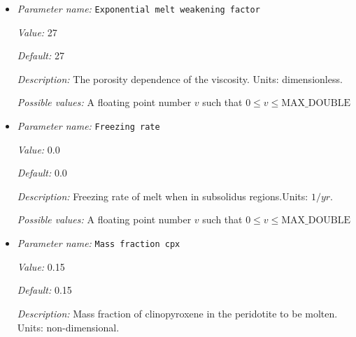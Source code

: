 \begin{itemize}
{\it Value:} 200.0


{\it Default:} 200.0


{\it Description:} The solidus temperature change for a depletion of 100\%. For positive values, the solidus gets increased for a positive peridotite field (depletion) and lowered for a negative peridotite field (enrichment). Scaling with depletion is linear. Only active when fractional melting is used. Units: $K$.


{\it Possible values:} A floating point number $v$ such that $0 \leq v \leq \text{MAX\_DOUBLE}$
\item {\it Parameter name:} {\tt Exponential melt weakening factor}
\label{parameters:Material model/Melt simple/Exponential melt weakening factor}


{\it Value:} 27


{\it Default:} 27


{\it Description:} The porosity dependence of the viscosity. Units: dimensionless.


{\it Possible values:} A floating point number $v$ such that $0 \leq v \leq \text{MAX\_DOUBLE}$
\item {\it Parameter name:} {\tt Freezing rate}
\label{parameters:Material model/Melt simple/Freezing rate}


{\it Value:} 0.0


{\it Default:} 0.0


{\it Description:} Freezing rate of melt when in subsolidus regions.Units: $1/yr$.


{\it Possible values:} A floating point number $v$ such that $0 \leq v \leq \text{MAX\_DOUBLE}$
\item {\it Parameter name:} {\tt Mass fraction cpx}
\label{parameters:Material model/Melt simple/Mass fraction cpx}


{\it Value:} 0.15


{\it Default:} 0.15


{\it Description:} Mass fraction of clinopyroxene in the peridotite to be molten. Units: non-dimensional.



\end{itemize}
